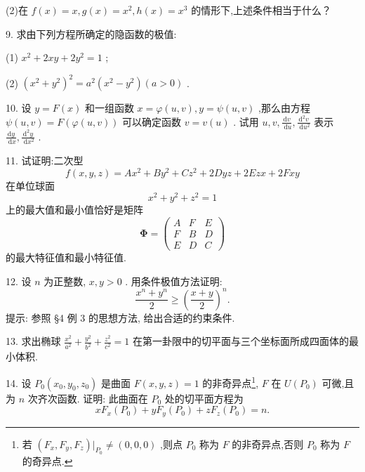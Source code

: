 (2)在 \(f\left( x\right)  = x,g\left( x\right)  = {x}^{2},h\left( x\right)  = {x}^{3}\) 的情形下,上述条件相当于什么？

9. 求由下列方程所确定的隐函数的极值:

(1) \({x}^{2} + {2xy} + 2{y}^{2} = 1\) ;

(2) \({\left( {x}^{2} + {y}^{2}\right) }^{2} = {a}^{2}\left( {{x}^{2} - {y}^{2}}\right) \left( {a > 0}\right)\) .

10. 设 \(y = F\left( x\right)\) 和一组函数 \(x = \varphi \left( {u,v}\right) ,y = \psi \left( {u,v}\right)\) ,那么由方程 \(\psi \left( {u,v}\right)  = F\left( {\varphi \left( {u,v}\right) }\right)\) 可以确定函数 \(v = v\left( u\right)\) . 试用 \(u,v,\frac{\mathrm{d}v}{\mathrm{\;d}u},\frac{{\mathrm{d}}^{2}v}{\mathrm{\;d}{u}^{2}}\) 表示 \(\frac{\mathrm{d}y}{\mathrm{\;d}x},\frac{{\mathrm{d}}^{2}y}{\mathrm{\;d}{x}^{2}}\) .

11. 试证明:二次型
\[
f\left( {x,y,z}\right)  = A{x}^{2} + B{y}^{2} + C{z}^{2} + {2Dyz} + {2Ezx} + {2Fxy}
\]
在单位球面
\[
{x}^{2} + {y}^{2} + {z}^{2} = 1
\]
上的最大值和最小值恰好是矩阵
\[
\mathbf{\Phi } = \left( \begin{array}{lll} A & F & E \\  F & B & D \\  E & D & C \end{array}\right)
\]
的最大特征值和最小特征值.

12. 设 \(n\) 为正整数, \(x,y > 0\) . 用条件极值方法证明:
\[
\frac{{x}^{n} + {y}^{n}}{2} \geq  {\left( \frac{x + y}{2}\right) }^{n}.
\]
提示: 参照 §4 例 3 的思想方法, 给出合适的约束条件.

13. 求出椭球 \(\frac{{x}^{2}}{{a}^{2}} + \frac{{y}^{2}}{{b}^{2}} + \frac{{z}^{2}}{{c}^{2}} = 1\) 在第一卦限中的切平面与三个坐标面所成四面体的最小体积.

14. 设 \({P}_{0}\left( {{x}_{0},{y}_{0},{z}_{0}}\right)\) 是曲面 \(F\left( {x,y,z}\right)  = 1\) 的非奇异点\footnote{若 \(\left( {{F}_{x},{F}_{y},{F}_{z}}\right) {|}_{{P}_{0}} \neq  \left( {0,0,0}\right)\) ,则点 \({P}_{0}\) 称为 \(F\) 的非奇异点,否则 \({P}_{0}\) 称为 \(F\) 的奇异点.}, \(F\) 在 \(U\left( {P}_{0}\right)\) 可微,且为 \(n\) 次齐次函数. 证明: 此曲面在 \({P}_{0}\) 处的切平面方程为
\[
x{F}_{x}\left( {P}_{0}\right)  + y{F}_{y}\left( {P}_{0}\right)  + z{F}_{z}\left( {P}_{0}\right)  = n.
\]




